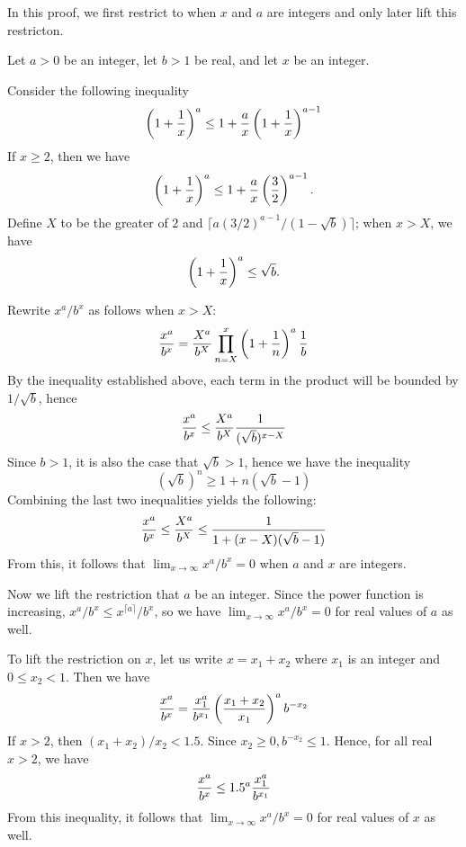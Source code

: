 \documentclass[12pt]{article}
\begin{document}
In this proof, we first restrict to when $x$ and $a$ are integers
and only later lift this restricton.

Let $a > 0$ be an integer, let $b > 1$ be real, and let $x$ be an
integer.

Consider the following inequality
 \[ \left( 1 + {1 \over x} \right)^a \le 1 + {a \over x} \left( 1 + {1 \over x}
 \right)^{a-1}  \]
If $x \ge 2$, then we have
 \[ \left( 1 + {1 \over x} \right)^a \le 1  + {a \over
 x} \left( {3 \over 2} \right)^{a-1} . \]
Define $X$ to be the greater of $2$ and $\lceil a
(3/2)^{a-1} / (1 - \sqrt{b}) \rceil$; when $x > X$, we have 
 \[ \left( 1 + {1 \over x} \right)^a \le \sqrt{b}. \] 

Rewrite $x^a / b^x$ as follows when $x > X$:
 \[ {x^a \over b^x} = {X^a \over b^X} \prod_{n=X}^x \left( 1 + {1 \over n} 
 \right)^a {1 \over b} \] 
By the inequality established above, each term in the product will be
bounded by $1 / \sqrt{b}$, hence
 \[  {x^a \over b^x} \le {X^a \over b^X} {1 \over (\sqrt{b})^{x - X}}
 \]
Since $b > 1$, it is also the case that $\sqrt{b} > 1$, hence we have
the inequality
 \[ (\sqrt{b})^n \ge 1 + n (\sqrt{b} - 1) \]
Combining the last two inequalities yields the following:
 \[ {x^a \over b^x} \le {X^a \over b^X} \le {1 \over 1 + (x - X)
 (\sqrt{b} - 1)} \]
From this, it follows that $\lim_{x \to \infty} x^a / b^x = 0$ when
$a$ and $x$ are integers.

Now we lift the restriction that $a$ be an integer.  Since the power
function is increasing, $x^a / b^x \le x^{\lceil a \rceil} /
b^x$, so we have  $\lim_{x \to \infty} x^a / b^x = 0$ for real values
of $a$ as well.

To lift the restriction on $x$, let us write $x = x_1 + x_2$ where
$x_1$ is an integer and $0 \le x_2 < 1$.  Then we have \[ {x^a \over
b^x} = {x_1^a \over b^{x_1}} \left( {x_1 + x_2 \over x_1} \right)^a
b^{-x_2} \] If $x > 2$, then $(x_1 + x_2) / x_2 < 1.5$.  Since $x_2
\ge 0, b^{-x_2} \le 1$.  Hence, for all real $x > 2$, we have \[ {x^a
\over b^x} \le 1.5^a {x_1^a \over b^{x_1}}\] From this inequality, it
follows that $\lim_{x \to \infty} x^a / b^x = 0$ for real values of
$x$ as well.
\end{document}
